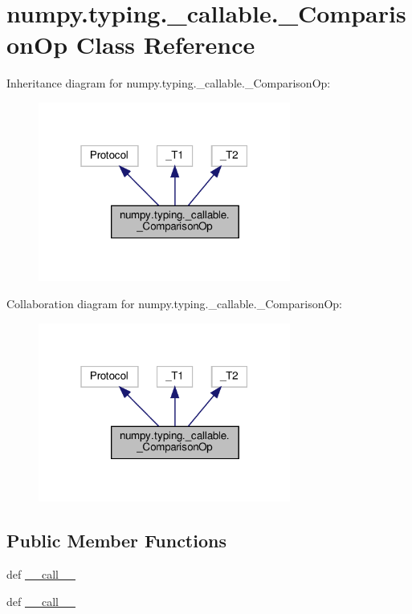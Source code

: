 \hypertarget{classnumpy_1_1typing_1_1__callable_1_1__ComparisonOp}{}\section{numpy.\+typing.\+\_\+callable.\+\_\+\+Comparison\+Op Class Reference}
\label{classnumpy_1_1typing_1_1__callable_1_1__ComparisonOp}


Inheritance diagram for numpy.\+typing.\+\_\+callable.\+\_\+\+Comparison\+Op\+:
\nopagebreak
\begin{figure}[H]
\begin{center}
\leavevmode
\includegraphics[width=235pt]{classnumpy_1_1typing_1_1__callable_1_1__ComparisonOp__inherit__graph}
\end{center}
\end{figure}


Collaboration diagram for numpy.\+typing.\+\_\+callable.\+\_\+\+Comparison\+Op\+:
\nopagebreak
\begin{figure}[H]
\begin{center}
\leavevmode
\includegraphics[width=235pt]{classnumpy_1_1typing_1_1__callable_1_1__ComparisonOp__coll__graph}
\end{center}
\end{figure}
\subsection*{Public Member Functions}
\begin{DoxyCompactItemize}
\item 
def \hyperlink{classnumpy_1_1typing_1_1__callable_1_1__ComparisonOp_a73c2f05cd8aa5bedad22afd76e6f1023}{\+\_\+\+\_\+call\+\_\+\+\_\+}
\item 
def \hyperlink{classnumpy_1_1typing_1_1__callable_1_1__ComparisonOp_a73c2f05cd8aa5bedad22afd76e6f1023}{\+\_\+\+\_\+call\+\_\+\+\_\+}
\end{DoxyCompactItemize}


